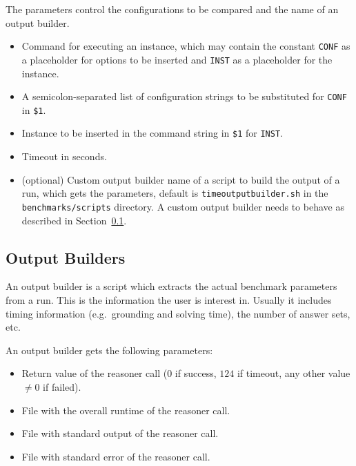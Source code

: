 \documentclass[a4paper]{article}
\begin{document}
		    The parameters control the configurations to be compared
		    and the name of an output builder.
		
		    \medskip{}
		    \begin{itemize}
				\item[{\tt \$1}:] Command for executing an instance, which may contain the constant {\tt CONF} as a placeholder
					for options to be inserted and {\tt INST} as a placeholder for the instance.
				\item[{\tt \$2}:] A semicolon-separated list of configuration strings to be substituted for {\tt CONF} in {\tt \$1}.
				\item[{\tt \$3}:] Instance to be inserted in the command string in {\tt \$1} for {\tt INST}.
				\item[{\tt \$4}:] Timeout in seconds.
				\item[{\tt \$5}:] (optional) Custom output builder name of a script to build the output of a run, which gets the parameters, default is {\tt timeoutputbuilder.sh}
					in the {\tt benchmarks/scripts} directory. A custom output builder needs to behave as described in Section~\ref{sec:architecture:outputbuilder}.
		    \end{itemize}
	
		\subsection{Output Builders}
		\label{sec:architecture:outputbuilder}
				
			An output builder is a script which extracts the actual benchmark parameters
			from a run. This is the information the user is interest in. Usually it
			includes timing information (e.g.~grounding and solving time), the number of answer sets, etc.
			
			An output builder gets the following parameters:
			    \begin{itemize}
					\item[{\tt \$1}:] Return value of the reasoner call ($0$ if success, $124$ if timeout, any other value $\not= 0$ if failed).
					\item[{\tt \$2}:] File with the overall runtime of the reasoner call.
					\item[{\tt \$3}:] File with standard output of the reasoner call.
					\item[{\tt \$4}:] File with standard error of the reasoner call.
			    \end{itemize}
			
\end{document}
